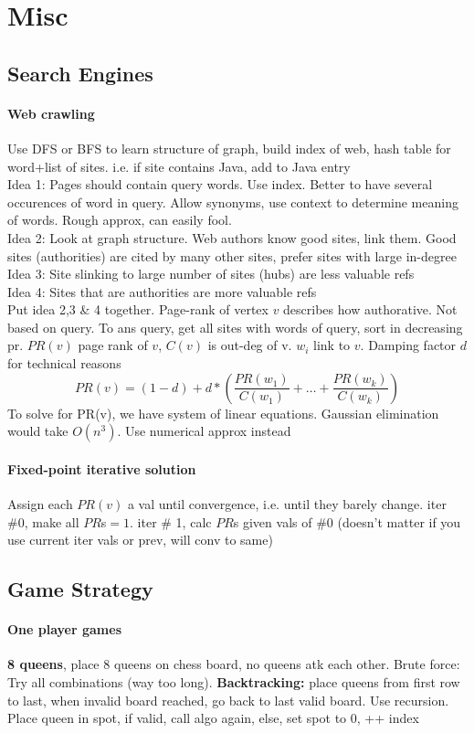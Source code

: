 \section{Misc}
\subsection{Search Engines}
\paragraph{Web crawling} Use DFS or BFS to learn structure of graph, build index of web, hash table for word+list of sites. i.e. if site contains Java, add to Java entry
\\ Idea 1: Pages should contain query words. Use index. Better to have several occurences of word in query. Allow synonyms, use context to determine meaning of words. Rough approx, can easily fool.
\\ Idea 2: Look at graph structure. Web authors know good sites, link them. Good sites (authorities) are cited by many other sites, prefer sites with large in-degree
\\ Idea 3: Site slinking to large number of sites (hubs) are less valuable refs
\\ Idea 4: Sites that are authorities are more valuable refs
\\ Put idea 2,3 \& 4 together. Page-rank of vertex $v$ describes how authorative. Not based on query. To ans query, get all sites with words of query, sort in decreasing pr. $PR(v)$ page rank of $v$, $C(v)$ is out-deg of v. $w_i$ link to $v$. Damping factor $d$ for technical reasons
$$PR(v)=(1-d)+d*\left(\frac{PR(w_1)}{C(w_1)}+\ldots+\frac{PR(w_k)}{C(w_k)}\right)$$ To solve for PR(v), we have system of linear equations. Gaussian elimination would take $O(n^3)$. Use numerical approx instead
\vspace{-7 pt}
\paragraph{Fixed-point iterative solution} Assign each $PR(v)$ a val until convergence, i.e. until they barely change. iter \#0, make all $PR$s$=1$. iter \# 1, calc $PR$s given vals of \#0 (doesn't matter if you use current iter vals or prev, will conv to same)
\subsection{Game Strategy}
\paragraph{One player games} \textbf{8 queens}, place 8 queens on chess board, no queens atk each other. Brute force: Try all combinations (way too long). \textbf{Backtracking:} place queens from first row to last, when invalid board reached, go back to last valid board. Use recursion. Place queen in spot, if valid, call algo again, else, set spot to 0, ++ index
\vspace{-7 pt}
